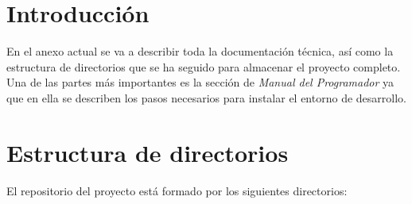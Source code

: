 
\section{Introducción}

En el anexo actual se va a describir toda la documentación técnica, así como la estructura de directorios que se ha seguido para almacenar el proyecto completo.
Una de las partes más importantes es la sección de \textit{Manual del Programador} ya que en ella se describen los pasos necesarios para instalar el entorno de desarrollo. 

\section{Estructura de directorios}

El repositorio del proyecto está formado por los siguientes directorios:

